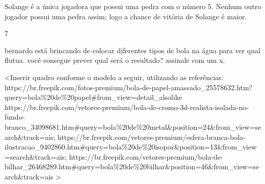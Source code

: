 Solange é a única
jogadora que possui uma pedra com o número 5. Nenhum outro jogador
possui uma pedra assim; logo a chance de vitória de Solange é maior.

\num{7}

bernardo está brincando de colocar diferentes tipos de bola na água
para ver qual flutua. você consegue prever qual será o resultado? assinale
com um x.

\textless{}Inserir quadro conforme o modelo a seguir, utilizando as
referências:
https://br.freepik.com/fotos-premium/bola-de-papel-amassado\_25578632.htm?query=bola\%20de\%20papel\#from\_view=detail\_alsolike
https://br.freepik.com/vetores-premium/bola-de-cromo-3d-realista-isolada-no-fundo-branco\_34098681.htm\#query=bola\%20de\%20metal\&position=24\&from\_view=search\&track=ais;
https://br.freepik.com/vetores-premium/esfera-branca-bola-ilustracao\_9402860.htm\#query=bola\%20de\%20isopor\&position=13\&from\_view=search\&track=ais;
https://br.freepik.com/vetores-premium/bola-de-bilhar\_26468289.htm\#query=bola\%20de\%20bilhar\&position=46\&from\_view=search\&track=ais
\textgreater{}

